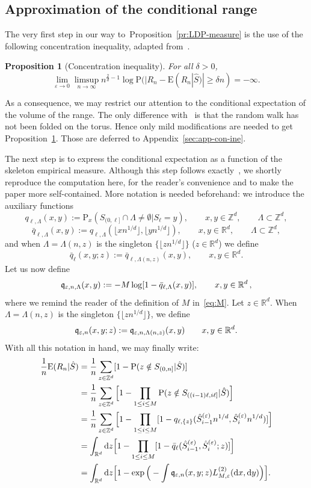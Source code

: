 \documentclass[a4paper,11pt]{amsart}
\numberwithin{equation}{section}
\newtheorem{proposition}[theorem]{Proposition}
\newcommand{\bbR}{{\ensuremath{\mathbb R}} }
\newcommand{\bbZ}{{\ensuremath{\mathbb Z}} }
\newcommand{\gd}{\delta}
\newcommand{\gep}{\varepsilon}
\newcommand{\gL}{\Lambda}
\newcommand{\dd}{\text{\rm d}}             %
\newcommand\bP{\ensuremath{\mathrm{P}}}
\newcommand\bE{\ensuremath{\mathrm{E}}}
\newcommand{\8}{\infty}
\newcommand{\beq}{\begin{equation}}
\newcommand{\eeq}{\end{equation}}
\newcommand{\ba}{\begin{aligned}}
\newcommand{\ea}{\end{aligned}}
\begin{document}
\subsection{Approximation of the conditional range}
\label{sec:cond-range}
The very first step in our way to~Proposition~\ref{pr:LDP-measure} is the use of the following concentration inequality, adapted from~\cite[Proposition 2.2.2]{Phetpradap}.
%
\begin{proposition}[Concentration inequality]
\label{pr:conc.ineq}
For all $\gd>0$,
\beq
\lim_{\gep\to 0} \limsup_{n\to\infty} n^{\frac2d -1} \log
\bP(|R_n - \bE(R_n | \hat S)| \ge \gd n) = -\infty.
\eeq
\end{proposition}
%
As a consequence, we may restrict our attention to the conditional expectation of the volume of the range. The only difference with~\cite[Proposition 2.2.2]{Phetpradap} is that the random walk has not been folded on the torus. Hence only mild modifications are needed to get Proposition~\ref{pr:conc.ineq}. Those are deferred to Appendix~\ref{sec:app-con-ine}.

The next step is to express the conditional expectation as a function of the skeleton empirical measure. Although this step follows exactly~\cite{Phetpradap, BBH2001}, we shortly reproduce the computation here, for the reader's convenience and to make the paper more self-contained. More notation is needed beforehand: we introduce the auxiliary functions
\beq
q_{\ell,\gL}(x,y) := \bP_x(S_{(0,\ell]} \cap \gL \neq \emptyset	 | S_\ell = y),
\qquad x,y\in \bbZ^d,
\qquad \gL \subset \bbZ^d,
\eeq
\beq
\bar q_{\ell,\gL}(x,y) := q_{\ell,\gL}(\lfloor xn^{1/d}\rfloor,\lfloor yn^{1/d}\rfloor),
\qquad x,y\in \bbR^d,
\qquad \gL \subset \bbZ^d,
\eeq
and when $\gL=\gL(n,z)$ is the singleton $\{\lfloor zn^{1/d}\rfloor\}$ ($z\in\bbR^d$) we define
\beq
\bar q_{\ell}(x,y;z) := \bar q_{\ell,\gL(n,z)}(x,y),
\qquad x,y\in \bbR^d.
\eeq
Let us now define
\beq
\frak{q}_{\gep, n, \gL}(x,y):= -M \log[1-\bar q_{\ell, \gL}(x, y)], \qquad x,y\in \bbR^d\,,
\eeq
where we remind the reader of the definition of $M$ in~\eqref{eq:M}.
Let $z\in\bbR^d$. When $\gL=\gL(n,z)$ is the singleton $\{\lfloor zn^{1/d}\rfloor\}$, we define
\beq
\label{def:frakq}
\frak{q}_{\gep,n}(x,y;z) := \frak{q}_{\gep,n,\gL(n,z)}(x,y)
\qquad x,y\in \bbR^d. 
\eeq
%
With all this notation in hand, we may finally write:
\beq
\label{eq:exp-cond-range}
\ba
\frac1n \bE(R_n | \hat S) &= \frac1n \sum_{z\in\bbZ^d} [1-\bP(z\notin S_{(0,n]} | \hat S)]\\
&= \frac1n \sum_{z\in\bbZ^d} \Big[ 1- \prod_{1\le i \le M} \bP(z\notin S_{((i-1)\ell, i\ell]} | \hat S)\Big]\\
&=\frac1n \sum_{z\in\bbZ^d} \Big[1-  \prod_{1\le i \le M} [1-q_{\ell,\{z\}}(\hat S_{i-1}^{(\gep)} n^{1/d}, \hat S_i^{(\gep)} n^{1/d})] \Big]\\
&= \int_{\bbR^d} \dd z\Big[ 1- \prod_{1\le i \le M}[ 1- \bar q_{\ell}(\hat S_{i-1}^{(\gep)}, \hat S_i^{(\gep)} ; z)]\Big]\\
&=\int_{\bbR^d} \dd z
\Big[
1- \exp\Big(- \int \frak{q}_{\gep,n}(x,y;z) L_{M,\gep}^{(2)}(\dd x, \dd y)\Big)
\Big].
\ea
\eeq
\end{document}
